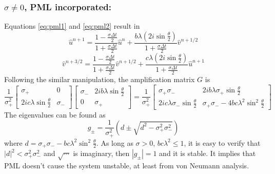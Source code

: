 \subsubsection{$\sigma\neq0$, PML incorporated:}
Equations \eqref{eq:pml1} and \eqref{eq:pml2} result in
\begin{equation}
 \hat{u}^{n+1}=\frac{1-\frac{\sigma\Delta t}{2}}{1+\frac{\sigma\Delta t}{2}}\hat{u}^n+\frac{b\lambda(2i\sin\frac{\theta}{2})}{1+\frac{\sigma\Delta t}{2}}\hat{v}^{n+1/2}
\end{equation}
\begin{equation}
 \hat{v}^{n+3/2}=\frac{1-\frac{\sigma\Delta t}{2}}{1+\frac{\sigma\Delta t}{2}}\hat{v}^{n+1/2}+
 \frac{c\lambda(2i\sin\frac{\theta}{2})}{1+\frac{\sigma\Delta t}{2}}\hat{u}^{n+1}
\end{equation}
Following the similar manipulation, the amplification matrix $G$ is
\begin{equation}
 \frac{1}{\sigma_{+}^2}\begin{bmatrix}
                        \sigma_{+} & 0\\
                        2ic\lambda \sin\frac{\theta}{2} & \sigma_{-}
                       \end{bmatrix}
                       \begin{bmatrix}
                        \sigma_{-} & 2ib\lambda \sin\frac{\theta}{2}\\
                        0 & \sigma_{+}
                       \end{bmatrix}
=\frac{1}{\sigma_{+}^2}\begin{bmatrix}
                        \sigma_{+}\sigma_{-} & 2ib\lambda \sigma_{+}\sin\frac{\theta}{2}\\
                        2ic\lambda \sigma_{-}\sin\frac{\theta}{2} & \sigma_{+}\sigma_{-}-4bc\lambda^2\sin^2\frac{\theta}{2}  
			\end{bmatrix}                       
\end{equation}
The eigenvalues can be found as
\begin{equation}
 g_{\pm}=\frac{1}{\sigma_{+}^2}\left(
 d\pm \sqrt{ d^2-\sigma_{+}^2\sigma_{-}^2}
 \right)
\end{equation}
where $d=\sigma_{+}\sigma_{-}-bc\lambda^2\sin^2\frac{\theta}{2}$.
 As long as $\sigma>0$,  $bc\lambda^2\leq 1$, it is easy to verify that $|d|^2<\sigma_{+}^2\sigma_{-}^2$ and $\sqrt{\cdots}$ is imaginary, then $|g_{\pm}|=1$ and it is stable. It implies that PML doesn't cause the system unstable, at least from von Neumann analysis.

